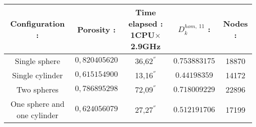 \begin{center}
\begin{tabular}{|c|c|c|c|c|}
\hline
\rowcolor{gray} Configuration :&Porosity :&Time elapsed : 1CPU$\times$2.9GHz&$D_k^{hom, \ 11}$ :&Nodes :\\
\hline
Single sphere&$0,820405620$&36,62${}^{''}$&$0.753883175$&18870 \\
\hline
Single cylinder&$0,615154900$&13,16${}^{''}$&$0.44198359$&14172 \\
\hline
Two spheres&$0,786895298$&72,09${}^{''}$&$0.718009229$&22896 \\
\hline
One sphere and one cylinder&$0,624056079$&27,27${}^{''}$&$0.512191706$&17199 \\
\hline
\end{tabular}
\end{center}


\begin{comment}
\begin{figure}[H]
\begin{center}
\begin{tabular}{|c|c|c|c|}
\hline
\subfloat[Mesh for a single sphere]{\texttt{[image: ../Figures3D/maillage\_per3D\_sphsur20.png]}}
&
\subfloat[Single cylinder]{\texttt{[image: ../Figures3D/maillage\_per3D\_cylsur20.png]}}
&
\subfloat[Two spheres]{\texttt{[image: ../Figures3D/maillage\_per3D\_2sphsur20.png]}}
&
\subfloat[One sphere and one cylinder]{\texttt{[image: ../Figures3D/maillage\_per3D\_cylsphsur20.png]}}
\\
\hline
\subfloat[Vector $\chi$]{\texttt{[image: ../Figures3D/sol\_7\_sur1sph\_un\_rayres20.png]}}
&
\subfloat[Vector $\chi$]{\texttt{[image: ../Figures3D/sol\_7\_sur1cyl\_un\_rayres20.png]}}
&
\subfloat[Vector $\chi$]{\texttt{[image: ../Figures3D/sol\_7\_sur12sph\_rayres20.png]}}
&
\subfloat[Vector $\chi$]{\texttt{[image: ../Figures3D/sol\_7\_sur1cylsph\_ray\_sphres20.png]}}
\\
\hline
\end{tabular}
\end{center}
\caption{Periodical meshes and vector $\chi$ with Finite Element Method}
\label{mesh_sol_3d}
\end{figure}
\end{comment}




